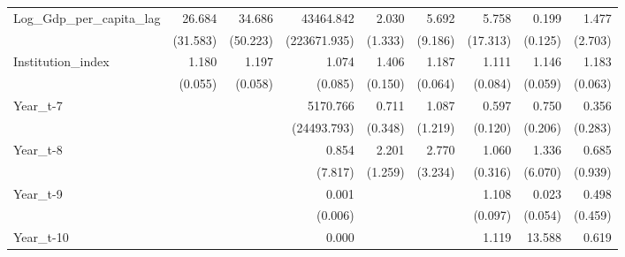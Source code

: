 \begin{table}[htbp]
\begin{tabular}{l*{8}{D{.}{.}{-1}}}
Log\_Gdp\_per\_capita\_lag&      26.684\sym{***}&      34.686\sym{**} &   43464.842\sym{**} &       2.030         &       5.692         &       5.758         &       0.199\sym{***}&       1.477         \\
                    &    (31.583)         &    (50.223)         &(223671.935)         &     (1.333)         &     (9.186)         &    (17.313)         &     (0.125)         &     (2.703)         \\
Institution\_index   &       1.180\sym{***}&       1.197\sym{***}&       1.074         &       1.406\sym{***}&       1.187\sym{***}&       1.111         &       1.146\sym{***}&       1.183\sym{***}\\
                    &     (0.055)         &     (0.058)         &     (0.085)         &     (0.150)         &     (0.064)         &     (0.084)         &     (0.059)         &     (0.063)         \\
Year\_t-7            &                     &                     &    5170.766\sym{*}  &       0.711         &       1.087         &       0.597\sym{**} &       0.750         &       0.356         \\
                    &                     &                     & (24493.793)         &     (0.348)         &     (1.219)         &     (0.120)         &     (0.206)         &     (0.283)         \\
Year\_t-8            &                     &                     &       0.854         &       2.201         &       2.770         &       1.060         &       1.336         &       0.685         \\
                    &                     &                     &     (7.817)         &     (1.259)         &     (3.234)         &     (0.316)         &     (6.070)         &     (0.939)         \\
Year\_t-9            &                     &                     &       0.001         &                     &                     &       1.108         &       0.023\sym{\%}  &       0.498         \\
                    &                     &                     &     (0.006)         &                     &                     &     (0.097)         &     (0.054)         &     (0.459)         \\
Year\_t-10           &                     &                     &       0.000         &                     &                     &       1.119         &      13.588\sym{*}  &       0.619         \\

\end{tabular}
\end{table}
